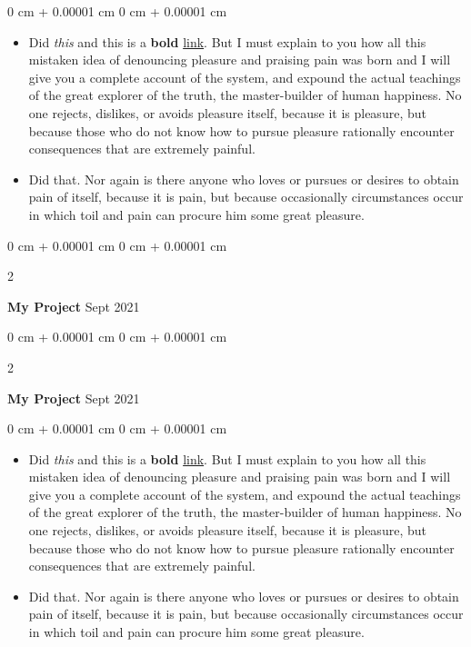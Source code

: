 \documentclass[10pt, letterpaper]{article}
\newenvironment{highlights}{
    \begin{itemize}[
        topsep=0.10 cm,
        parsep=0.10 cm,
        partopsep=0pt,
        itemsep=0pt,
        leftmargin=0 cm + 10pt
    ]
}{
    \end{itemize}
} %
\newenvironment{onecolentry}{
    \begin{adjustwidth}{
        0 cm + 0.00001 cm
    }{
        0 cm + 0.00001 cm
    }
}{
    \end{adjustwidth}
} %
\newenvironment{twocolentry}[2][]{
    \onecolentry
    \def\secondColumn{#2}
    \setcolumnwidth{\fill, 4.5 cm}
    \begin{paracol}{2}
}{
    \switchcolumn \raggedleft \secondColumn
    \end{paracol}
    \endonecolentry
} %
\begin{document}
        \vspace{0.10 cm}
        \begin{onecolentry}
            \begin{highlights}
                \item Did \textit{this} and this is a \textbf{bold} \href{https://example.com}{link}. But I must explain to you how all this mistaken idea of denouncing pleasure and praising pain was born and I will give you a complete account of the system, and expound the actual teachings of the great explorer of the truth, the master-builder of human happiness. No one rejects, dislikes, or avoids pleasure itself, because it is pleasure, but because those who do not know how to pursue pleasure rationally encounter consequences that are extremely painful.
                \item Did that. Nor again is there anyone who loves or pursues or desires to obtain pain of itself, because it is pain, but because occasionally circumstances occur in which toil and pain can procure him some great pleasure.
            \end{highlights}
        \end{onecolentry}


        \vspace{0.2 cm}

        \begin{twocolentry}{
            Sept 2021
        }
            \textbf{My Project}\end{twocolentry}



        \vspace{0.2 cm}

        \begin{twocolentry}{
            Sept 2021
        }
            \textbf{My Project}\end{twocolentry}

        \vspace{0.10 cm}
        \begin{onecolentry}
            \begin{highlights}
                \item Did \textit{this} and this is a \textbf{bold} \href{https://example.com}{link}. But I must explain to you how all this mistaken idea of denouncing pleasure and praising pain was born and I will give you a complete account of the system, and expound the actual teachings of the great explorer of the truth, the master-builder of human happiness. No one rejects, dislikes, or avoids pleasure itself, because it is pleasure, but because those who do not know how to pursue pleasure rationally encounter consequences that are extremely painful.
                \item Did that. Nor again is there anyone who loves or pursues or desires to obtain pain of itself, because it is pain, but because occasionally circumstances occur in which toil and pain can procure him some great pleasure.
            \end{highlights}
        \end{onecolentry}
\end{document}
